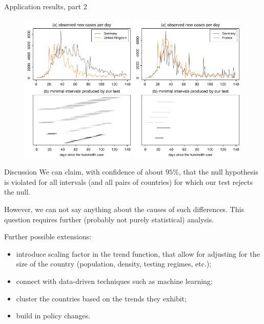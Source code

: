 \documentclass[10pt]{beamer}
\begin{document}
\begin{frame}{Application results, part 2}
	\begin{figure}
		\includegraphics[width=0.49\textwidth]{plots/DEU_vs_GBR_presentation}
		\hfill
		\includegraphics[width=0.49\textwidth]{plots/DEU_vs_FRA_presentation}
	\end{figure}
\end{frame}


\begin{frame}{Discussion}
We can claim, with confidence of about $95\%$, that the null hypothesis is violated for all intervals (and all pairs of countries) for which our test rejects the null. \pause

However, we can not say anything about the causes of such differences. This question requires further (probably not purely statistical) analysis.\pause

Further possible extensions:
\vspace{-2mm}
\begin{itemize}
	\item introduce scaling factor in the trend function, that allow for adjusting for the size of the country (population, density, testing regimes, etc.);\pause
	\item connect with data-driven techniques such as machine learning;\pause
	\item cluster the countries based on the trends they exhibit; \pause
	\item build in policy changes.
\end{itemize}
\end{frame}
\end{document}
